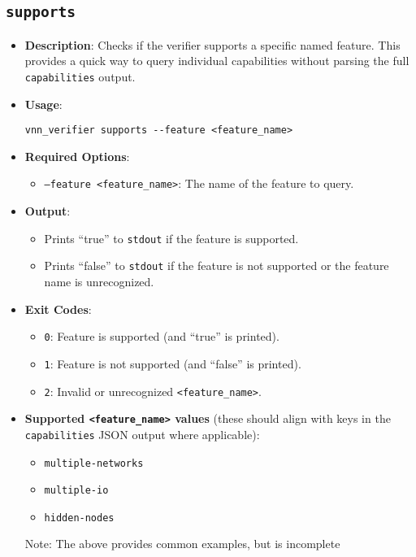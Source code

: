 \subsection{\texttt{supports}}
\begin{itemize}
    \item \textbf{Description}: Checks if the verifier supports a specific named feature. This provides a quick way to query individual capabilities without parsing the full \texttt{capabilities} output.
    \item \textbf{Usage}:
    \begin{lstlisting}[style=bash]
vnn_verifier supports --feature <feature_name> \end{lstlisting}
    \item \textbf{Required Options}:
    \begin{itemize}
        \item \texttt{--feature <feature\_name>}: The name of the feature to query.
    \end{itemize}
    \item \textbf{Output}:
    \begin{itemize}
        \item Prints ``true'' to \texttt{stdout} if the feature is supported.
        \item Prints ``false'' to \texttt{stdout} if the feature is not supported or the feature name is unrecognized.
    \end{itemize}
    \item \textbf{Exit Codes}:
    \begin{itemize}
        \item \texttt{0}: Feature is supported (and ``true'' is printed).
        \item \texttt{1}: Feature is not supported (and ``false'' is printed).
        \item \texttt{2}: Invalid or unrecognized \texttt{<feature\_name>}.
    \end{itemize}
    \item \textbf{Supported \texttt{<feature\_name>} values} (these should align with keys in the \texttt{capabilities} JSON output where applicable):
    \begin{itemize}
        \item \texttt{multiple-networks}
        \item \texttt{multiple-io}
        \item \texttt{hidden-nodes}
    \end{itemize}
    Note: The above provides common examples, but is incomplete
\end{itemize}